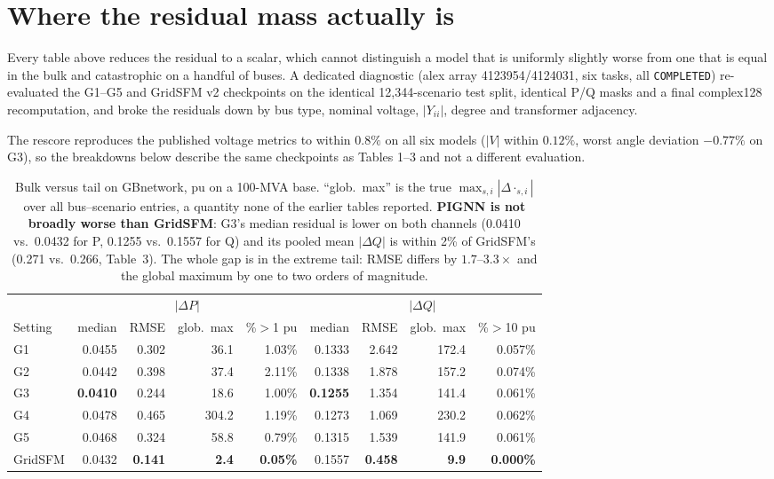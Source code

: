 \documentclass[10pt]{article}
\begin{document}
\section{Where the residual mass actually is}
\label{sec:massdiag}

Every table above reduces the residual to a scalar, which cannot distinguish a
model that is uniformly slightly worse from one that is equal in the bulk and
catastrophic on a handful of buses.  A dedicated diagnostic (alex array
4123954/4124031, six tasks, all \texttt{COMPLETED}) re-evaluated the G1--G5 and
GridSFM v2 checkpoints on the identical 12{,}344-scenario test split, identical
P/Q masks and a final complex128 recomputation, and broke the residuals down by
bus type, nominal voltage, $|Y_{ii}|$, degree and transformer adjacency.

The rescore reproduces the published voltage metrics to within $0.8\%$ on all
six models ($|V|$ within $0.12\%$, worst angle deviation $-0.77\%$ on G3), so
the breakdowns below describe the same checkpoints as Tables 1--3 and not a
different evaluation.

\begin{table}[H]
\centering\footnotesize
\setlength{\tabcolsep}{3pt}
\begin{tabular}{lrrrrrrrr}
\toprule
& \multicolumn{4}{c}{$|\Delta P|$} & \multicolumn{4}{c}{$|\Delta Q|$}\\
\cmidrule(lr){2-5}\cmidrule(lr){6-9}
Setting & median & RMSE & glob.\ max & \%$>$1 pu & median & RMSE & glob.\ max & \%$>$10 pu\\
\midrule
G1 & 0.0455 & 0.302 & 36.1 & 1.03\% & 0.1333 & 2.642 & 172.4 & 0.057\%\\
G2 & 0.0442 & 0.398 & 37.4 & 2.11\% & 0.1338 & 1.878 & 157.2 & 0.074\%\\
G3 & \textbf{0.0410} & 0.244 & 18.6 & 1.00\% & \textbf{0.1255} & 1.354 & 141.4 & 0.061\%\\
G4 & 0.0478 & 0.465 & 304.2 & 1.19\% & 0.1273 & 1.069 & 230.2 & 0.062\%\\
G5 & 0.0468 & 0.324 & 58.8 & 0.79\% & 0.1315 & 1.539 & 141.9 & 0.061\%\\
GridSFM & 0.0432 & \textbf{0.141} & \textbf{2.4} & \textbf{0.05\%} & 0.1557 & \textbf{0.458} & \textbf{9.9} & \textbf{0.000\%}\\
\bottomrule
\end{tabular}
\caption{Bulk versus tail on GBnetwork, pu on a 100-MVA base.  ``glob.\ max''
is the true $\max_{s,i}|\Delta\cdot_{s,i}|$ over all bus--scenario entries, a
quantity none of the earlier tables reported.  \textbf{PIGNN is not broadly
worse than GridSFM}: G3's median residual is lower on both channels
(0.0410 vs.\ 0.0432 for P, 0.1255 vs.\ 0.1557 for Q) and its pooled mean
$|\Delta Q|$ is within 2\% of GridSFM's (0.271 vs.\ 0.266, Table~3).  The whole
gap is in the extreme tail: RMSE differs by $1.7$--$3.3\times$ and the global
maximum by one to two orders of magnitude.}
\end{table}
\end{document}
